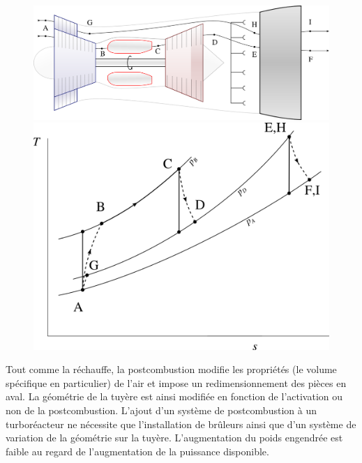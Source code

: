 		\begin{figure}
			\begin{center}
				\includegraphics[scale=0.6]{images/circuit_postcombustion.png}\vspace{0.5cm}
				\includegraphics[scale=0.6]{images/ts_gp_postcombustion.png}
			\end{center}
			\label{fig_postcombustion}
		\end{figure}

		Tout comme la réchauffe, la postcombustion modifie les propriétés (le volume spécifique en particulier) de l’air et impose un redimensionnement des pièces en aval. La géométrie de la tuyère est ainsi modifiée en fonction de l’activation ou non de la postcombustion. L’ajout d’un système de postcombustion à un turboréacteur ne nécessite que l'installation de brûleurs ainsi que d’un système de variation de la géométrie sur la tuyère. L’augmentation du poids engendrée est faible au regard de l’augmentation de la puissance disponible.

